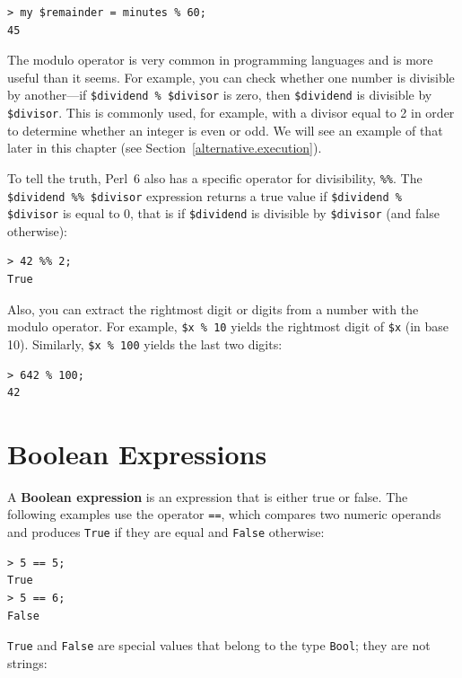 \begin{verbatim}
> my $remainder = minutes % 60;
45
\end{verbatim}
%
The modulo operator is very common in programming languages
and is more useful than it seems.  For example, you can 
check whether one number is divisible by another---if 
{\tt \$dividend \% \$divisor} is zero, then {\tt \$dividend} 
is divisible by {\tt \$divisor}. This is commonly used, for 
example, with a divisor equal to 2 in order to determine 
whether an integer is even or odd. We will see an example 
of that later in this chapter (see Section~\ref{alternative.execution}).

To tell the truth, Perl~6 also has a specific operator for 
divisibility, \verb"%%". The \verb'$dividend %% $divisor' 
expression returns a true value if
\verb'$dividend % $divisor' is equal to 0,  
that is if {\tt \$dividend} is divisible by {\tt \$divisor} (and false otherwise):
\begin{verbatim}
> 42 %% 2;
True
\end{verbatim}

Also, you can extract the rightmost digit
or digits from a number with the modulo operator.  For example, {\tt \$x \% 10} yields the
rightmost digit of {\tt \$x} (in base 10).  Similarly, {\tt \$x \% 100}
yields the last two digits:

\begin{verbatim}
> 642 % 100;
42
\end{verbatim}
%



\section{Boolean Expressions}

A {\bf Boolean expression} is an expression that is either true
or false.  The following examples use the operator {\tt ==}, 
which compares two numeric operands and produces
{\tt True} if they are equal and {\tt False} otherwise:

\begin{verbatim}
> 5 == 5;
True
> 5 == 6;
False
\end{verbatim}
%
{\tt True} and {\tt False} are special
values that belong to the type {\tt Bool}; they are not strings:


